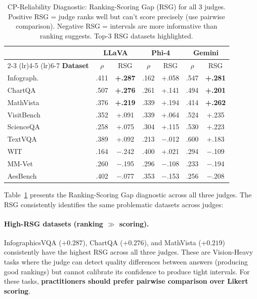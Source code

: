 \documentclass{article}
\begin{document}
\begin{table}[t]
\centering
\caption{CP-Reliability Diagnostic: Ranking-Scoring Gap (RSG) for all 3 judges. Positive RSG = judge ranks well but can't score precisely (use pairwise comparison). Negative RSG = intervals are more informative than ranking suggests. Top-3 RSG datasets highlighted.}
\label{tab:rsg}
\small
\begin{tabular}{lcccccc}
\toprule
& \multicolumn{2}{c}{\textbf{LLaVA}} & \multicolumn{2}{c}{\textbf{Phi-4}} & \multicolumn{2}{c}{\textbf{Gemini}} \\
\cmidrule(lr){2-3} \cmidrule(lr){4-5} \cmidrule(lr){6-7}
\textbf{Dataset} & $\rho$ & RSG & $\rho$ & RSG & $\rho$ & RSG \\
\midrule
Infograph. & .411 & \textbf{+.287} & .162 & +.058 & .547 & \textbf{+.281} \\
ChartQA & .507 & \textbf{+.276} & .261 & +.141 & .494 & \textbf{+.201} \\
MathVista & .376 & \textbf{+.219} & .339 & +.194 & .414 & \textbf{+.262} \\
VisitBench & .352 & +.091 & .339 & +.064 & .524 & +.235 \\
ScienceQA & .258 & +.075 & .304 & +.115 & .530 & +.223 \\
TextVQA & .389 & +.092 & .213 & $-$.012 & .600 & +.183 \\
\midrule
WIT & .164 & $-$.242 & .400 & +.021 & .294 & $-$.109 \\
MM-Vet & .260 & $-$.195 & .296 & $-$.108 & .233 & $-$.194 \\
AesBench & .402 & $-$.077 & .353 & $-$.153 & .256 & $-$.208 \\
\bottomrule
\end{tabular}
\end{table}

Table~\ref{tab:rsg} presents the Ranking-Scoring Gap diagnostic across all three judges. The RSG consistently identifies the same problematic datasets across judges:

\paragraph{High-RSG datasets (ranking $\gg$ scoring).} InfographicsVQA ($+0.287$), ChartQA ($+0.276$), and MathVista ($+0.219$) consistently have the highest RSG across all three judges. These are Vision-Heavy tasks where the judge can detect quality differences between answers (producing good rankings) but cannot calibrate its confidence to produce tight intervals. For these tasks, \textbf{practitioners should prefer pairwise comparison over Likert scoring}.
\end{document}
